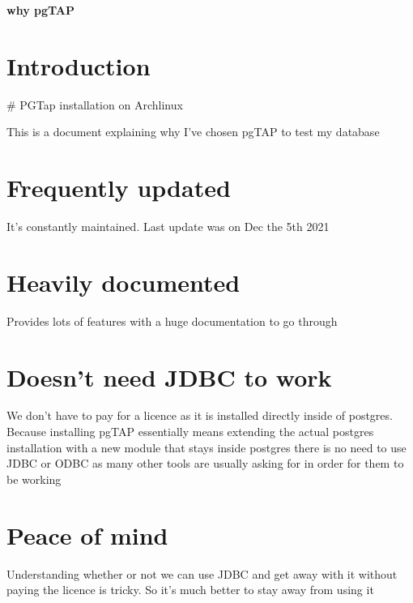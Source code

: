 \documentclass[a4paper,12pt]{article}
\begin{document}
\textbf{why pgTAP}
\tableofcontents

\section{Introduction}

# PGTap installation on Archlinux

This is a document explaining why I've chosen pgTAP to test my database

\section{Frequently updated}
It's constantly maintained. Last update was on Dec the 5th 2021

\section{Heavily documented}
Provides lots of features with a huge documentation to go through

\section{Doesn't need JDBC to work}
We don't have to pay for a licence as it is installed directly inside of postgres. Because installing pgTAP essentially means extending the actual postgres installation with a new module that stays inside postgres there is no need to use JDBC or ODBC as many other tools are usually asking for in order for them to be working


\section{Peace of mind}
Understanding whether or not we can use JDBC and get away with it without paying the licence is tricky. So it's much better to stay away from using it


\printindex
\end{document}
